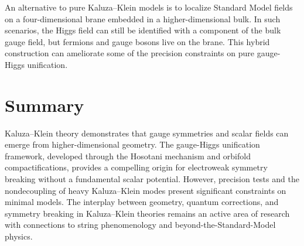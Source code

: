 An alternative to pure Kaluza--Klein models is to localize Standard Model fields
on a four-dimensional brane embedded in a higher-dimensional bulk.  In such
scenarios, the Higgs field can still be identified with a component of the bulk
gauge field, but fermions and gauge bosons live on the brane.  This hybrid
construction can ameliorate some of the precision constraints on pure
gauge-Higgs unification.

\section*{Summary}

Kaluza--Klein theory demonstrates that gauge symmetries and scalar fields can
emerge from higher-dimensional geometry.  The gauge-Higgs unification framework,
developed through the Hosotani mechanism and orbifold compactifications, provides
a compelling origin for electroweak symmetry breaking without a fundamental scalar
potential.  However, precision tests and the nondecoupling of heavy Kaluza--Klein
modes present significant constraints on minimal models.  The interplay between
geometry, quantum corrections, and symmetry breaking in Kaluza--Klein theories
remains an active area of research with connections to string phenomenology and
beyond-the-Standard-Model physics.

